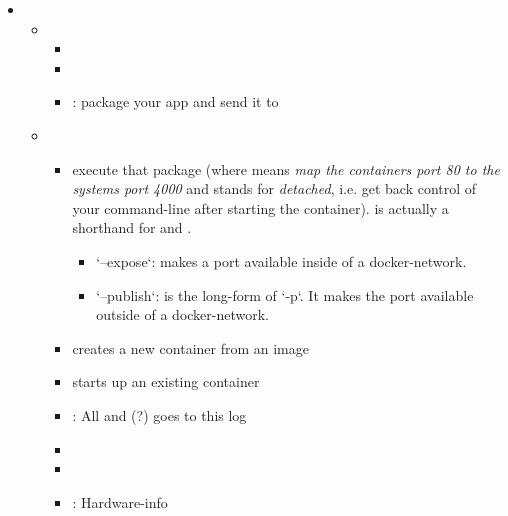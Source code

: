 \begin{itemize}
    \item {} \begin{itemize}
        \item {} \begin{itemize}
                \item {}
                \item {}
                \item {}: package your app and send it to 
            \end{itemize}
        \item {} \begin{itemize}
                \item {}execute that package
                    (where  means \emph{map the containers port 80 to the systems port 4000} and  stands for \emph{detached},
                    i.e. get back control of your command-line after starting the container).  is actually a shorthand for  and . \begin{itemize}
                      \item `--expose`: makes a port available inside of a docker-network.
                      \item `--publish`: is the long-form of `-p`. It makes the port available outside of a docker-network.
                    \end{itemize}
                \item {} creates a new container from an image
                \item {} starts up an existing container
                \item {}: All  and  (?) goes to this log
                \item {}
                \item {}
                \item {}: Hardware-info

\end{itemize}
\end{itemize}
\end{itemize}
